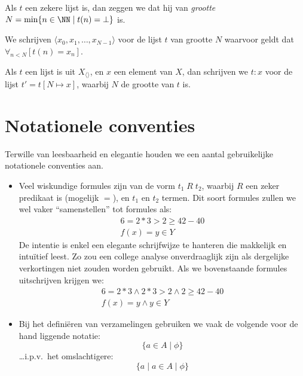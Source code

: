 Als $t$ een zekere lijst is, dan zeggen we dat hij van \emph{grootte} $N = \min\{n\in\NN \mid t(n) = \bot\}$ is.

We schrijven $\langle x_0, x_1, \dots, x_{N-1}\rangle$ voor de lijst $t$ van grootte $N$ waarvoor geldt dat $\forall_{n < N}[t(n) = x_n]$.

Als $t$ een lijst is uit $X_{\langle\rangle}$, en $x$ een element van $X$, dan schrijven we $t:x$ voor de lijst $t' = t[N \mapsto x]$, waarbij $N$ de grootte van $t$ is.

\section{Notationele conventies}

Terwille van leesbaarheid en elegantie houden we een aantal gebruikelijke notationele conventies aan.

\begin{itemize}
  \item Veel wiskundige formules zijn van de vorm $t_1\; R\; t_2$, waarbij $R$ een zeker predikaat is (mogelijk $=$), en $t_1$ en $t_2$ termen. Dit soort formules zullen we wel vaker ``samenstellen'' tot formules als:
  \begin{eqnarray}
    6 = 2 * 3 > 2 \ge 42 - 40 \\
    f(x) = y \in Y
  \end{eqnarray}
  De intentie is enkel een elegante schrijfwijze te hanteren die makkelijk en intuïtief leest. Zo zou een college analyse onverdraaglijk zijn als dergelijke verkortingen niet zouden worden gebruikt. Als we bovenstaande formules uitschrijven krijgen we:
  \begin{eqnarray}
    6 = 2 * 3 \land 2 * 3 > 2 \land 2 \ge 42 - 40 \\
    f(x) = y \land y \in Y
  \end{eqnarray}
  \item Bij het definiëren van verzamelingen gebruiken we vaak de volgende voor de hand liggende notatie: $$ \{a \in A \mid \phi \} $$ \dots i.p.v.~het omslachtigere: $$ \{a \mid a \in A \mid \phi\} $$
\end{itemize}
